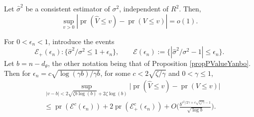 \documentclass[10pt,a4paper]{amsart}
\newcommand{\pr}{\mathop{\mathrm{pr}}}
\begin{document}
\begin{proposition}\label{propPValueYanbo}
	Let $\hat\sigma^2$ be a consistent estimator of $\sigma^2$, independent of $R^2$. Then, 
	\[
	\sup_{v>0}|\pr(\hat V \leq v) - \pr( V \leq v)| = o(1).
	\]      
\end{proposition}

\begin{lemma}\label{lemmaPart1}
	For $0<\epsilon_n <1$, introduce the events 
	\[
	\mathcal{E}_+(\epsilon_n) : \{\hat\sigma^2/\sigma^2 \leq 1+\epsilon_n\}, \quad \quad
	\mathcal{E}(\epsilon_n) := \{|\hat\sigma^2/\sigma^2 - 1| \leq \epsilon_n\}.
	\]
	Let $b = n -d_\theta$, the other notation being that of Proposition \ref{propPValueYanbo}. Then for $\epsilon_n   =  c\sqrt{\log(\gamma b)/\gamma b }$, for some $c < 2\sqrt{\zeta/\gamma}$ and $0 <\gamma \leq 1$,
	\begin{align*}
		&\sup_{|v - b| <   2\sqrt{\zeta b\log(b)} + 2\zeta\log(b)  } \bigl|\pr(\hat V \leq v) - \pr(V \leq v)\bigr| \\
		&\leq \pr(\mathcal{E}^c(\epsilon_n)) + 2\pr(\mathcal{E}_{+}^c(\epsilon_n)) + O\biggl( \frac{b^{c^2/2\gamma + c\sqrt{\zeta/\gamma} - 1}}{\sqrt{\log b}}\biggr).
	\end{align*}
\end{lemma}
\end{document}
